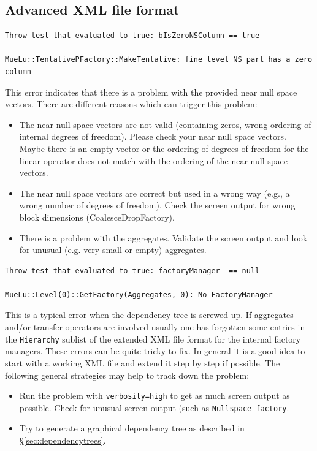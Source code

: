 \documentclass[10pt,fleqn]{book}
\begin{document}
\subsection{Advanced XML file format}

\begin{cBox}
\begin{lstlisting}
Throw test that evaluated to true: bIsZeroNSColumn == true

MueLu::TentativePFactory::MakeTentative: fine level NS part has a zero column
\end{lstlisting}
\end{cBox}
This error indicates that there is a problem with the provided near null space vectors. There are different reasons which can trigger this problem:
\begin{itemize}
\item The near null space vectors are not valid (containing zeros, wrong ordering of internal degrees of freedom). Please check your near null space vectors. Maybe there is an empty vector or the ordering of degrees of freedom for the linear operator does not match with the ordering of the near null space vectors.
\item The near null space vectors are correct but used in a wrong way (e.g., a wrong number of degrees of freedom). Check the screen output for wrong block dimensions (CoalesceDropFactory).
\item There is a problem with the aggregates. Validate the screen output and look for unusual (e.g. very small or empty) aggregates.
\end{itemize}


\begin{cBox}
\begin{lstlisting}
Throw test that evaluated to true: factoryManager_ == null

MueLu::Level(0)::GetFactory(Aggregates, 0): No FactoryManager
\end{lstlisting}
\end{cBox}
This is a typical error when the dependency tree is screwed up. If aggregates and/or transfer operators are involved usually one has forgotten some entries in the \verb|Hierarchy| sublist of the extended XML file format for the internal factory managers. These errors can be quite tricky to fix. In general it is a good idea to start with a working XML file and extend it step by step if possible.
The following general strategies may help to track down the problem:
\begin{itemize}
\item Run the problem with \verb|verbosity=high| to get as much screen output as possible. Check for unusual screen output (such as \verb|Nullspace factory|.
\item Try to generate a graphical dependency tree as described in \S\ref{sec:dependencytrees}.
\end{itemize}
\end{document}
